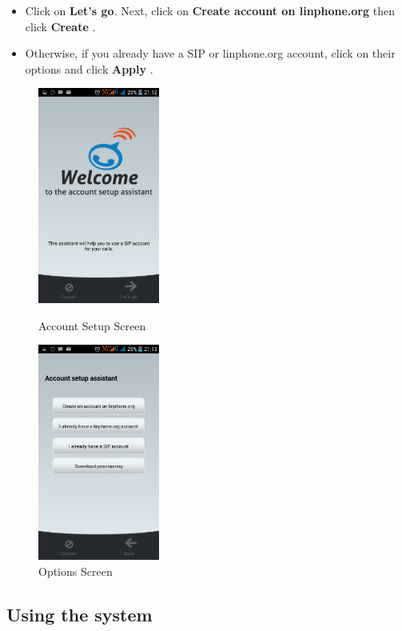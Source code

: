 \documentclass[a4paper]{article}
\begin{document}
\begin{itemize}
\item Click on \textbf{Let's go}. Next, click on \textbf{Create account on linphone.org} then click \textbf{Create} . \\
\item Otherwise, if you already have a SIP or linphone.org account, click on their options and click \textbf{Apply} .
\end{itemize}

\begin{figure}[h]
  \centering
  \begin{minipage}[h]{0.4\textwidth}
    \includegraphics[width=40mm, scale=0.5]{pictures/welcome.png}
    \caption{Account Setup Screen}
  \end{minipage}
  \hfill
  \begin{minipage}[h]{0.4\textwidth}
    \includegraphics[width=40mm, scale=0.5]{pictures/options.png}
    \caption{Options Screen}
  \end{minipage}
\end{figure}


\newpage

\subsection{Using the system}
\end{document}
